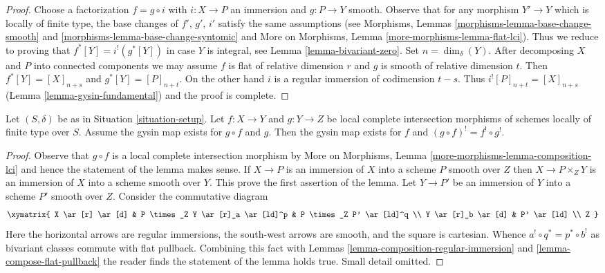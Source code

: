 \begin{proof}
Choose a factorization $f = g \circ i$ with $i : X \to P$
an immersion and $g : P \to Y$ smooth. Observe that for
any morphism $Y' \to Y$ which is locally of finite type,
the base changes of $f'$, $g'$, $i'$ satisfy the same
assumptions (see Morphisms, Lemmas \ref{morphisms-lemma-base-change-smooth}
and \ref{morphisms-lemma-base-change-syntomic} and
More on Morphisms, Lemma \ref{more-morphisms-lemma-flat-lci}).
Thus we reduce to proving that $f^*[Y] = i^!(g^*[Y])$ in case $Y$
is integral, see Lemma \ref{lemma-bivariant-zero}. Set $n = \dim_\delta(Y)$.
After decomposing $X$ and $P$ into connected components we
may assume $f$ is flat of relative dimension $r$ and
$g$ is smooth of relative dimension $t$.
Then $f^*[Y] = [X]_{n + s}$ and $g^*[Y] = [P]_{n + t}$.
On the other hand $i$ is a regular immersion of codimension $t - s$.
Thus $i^![P]_{n + t} = [X]_{n + s}$ (Lemma \ref{lemma-gysin-fundamental})
and the proof is complete.
\end{proof}

\begin{lemma}
\label{lemma-lci-gysin-composition}
Let $(S, \delta)$ be as in Situation \ref{situation-setup}.
Let $f : X \to Y$ and $g : Y \to Z$ be local complete intersection morphisms
of schemes locally of finite type over $S$. Assume the gysin
map exists for $g \circ f$ and $g$. Then the gysin map exists for $f$
and $(g \circ f)^! = f^! \circ g^!$.
\end{lemma}

\begin{proof}
Observe that $g \circ f$ is a local complete intersection morphism
by More on Morphisms, Lemma \ref{more-morphisms-lemma-composition-lci}
and hence the statement of the lemma makes sense.
If $X \to P$ is an immersion of $X$ into a scheme $P$ smooth over $Z$
then $X \to P \times_Z Y$ is an immersion of $X$ into a scheme smooth
over $Y$. This prove the first assertion of the lemma.
Let $Y \to P'$ be an immersion of $Y$ into a scheme $P'$ smooth over $Z$.
Consider the commutative diagram
$$
\xymatrix{
X \ar[r] \ar[d] &
P \times_Z Y \ar[r]_a \ar[ld]^p &
P \times_Z P' \ar[ld]^q \\
Y \ar[r]_b \ar[d] &
P' \ar[ld] \\
Z
}
$$
Here the horizontal arrows are regular immersions, the south-west arrows
are smooth, and the square is cartesian. Whence
$a^! \circ q^* = p^* \circ b^!$ as bivariant classes commute
with flat pullback. Combining this fact with
Lemmas \ref{lemma-composition-regular-immersion} and
\ref{lemma-compose-flat-pullback}
the reader finds the statement of the lemma holds true.
Small detail omitted.
\end{proof}

